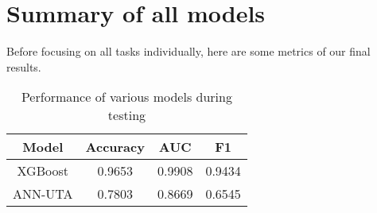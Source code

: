 \documentclass[../main.tex]{subfiles}
\begin{document}
\section{Summary of all models}
Before focusing on all tasks individually, here are some metrics of our final
results.

\begin{table}[H]
	\begin{center}
		\begin{tabular}{c||c|c|c}
			\hline
			Model & Accuracy & AUC & F1 \\
			\hline
			\hline
			XGBoost & 0.9653 & 0.9908 & 0.9434 \\
			ANN-UTA & 0.7803 & 0.8669 & 0.6545 \\
			\hline
		\end{tabular}
		\caption{Performance of various models during testing}
	\end{center}
\end{table}
\end{document}

